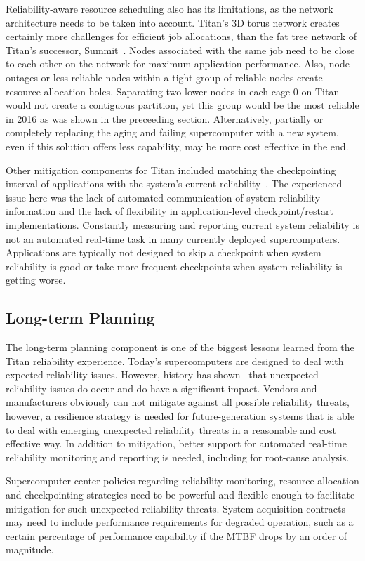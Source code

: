 Reliability-aware resource scheduling also has its limitations, as the network
architecture needs to be taken into account. Titan's 3D torus network creates
certainly more challenges for efficient job allocations, than the fat tree
network of Titan's successor, Summit~\cite{olcf:summit}. Nodes associated with
the same job need to be close to each other on the network for maximum
application performance. Also, node outages or less reliable nodes within a
tight group of reliable nodes create resource allocation
holes. Saparating two lower nodes in each cage 0 on Titan would not
create a contiguous partition, yet this group would be the most
reliable in 2016 as was shown in the preceeding section.
%
Alternatively, partially or completely replacing the aging and failing
supercomputer with a new system, even if this solution offers less capability,
may be more cost effective in the end.

Other mitigation components for Titan included matching the checkpointing
interval of applications with the system's current
reliability~\cite{bautista-gomez16reducing, 6903564}. The experienced issue here
was the lack of automated communication of system reliability information and
the lack of flexibility in application-level checkpoint/restart implementations.
Constantly measuring and reporting current system reliability is not an automated
real-time task in many currently deployed supercomputers. Applications are
typically not designed to skip a checkpoint when system reliability is good or
take more frequent checkpoints when system reliability is getting worse.

\subsection{Long-term Planning}
\label{section:planning}

The long-term planning component is one of the biggest lessons learned from the
Titan reliability experience. Today's supercomputers are designed to deal with
expected reliability issues. However, history has shown~\cite{geist12kill} that
unexpected reliability issues do occur and do have a significant impact. Vendors
and manufacturers obviously can not mitigate against all possible reliability
threats, however, a resilience strategy is needed for future-generation systems
that is able to deal with emerging unexpected reliability threats in a
reasonable and cost effective way. In addition to mitigation, better support for
automated real-time reliability monitoring and reporting is needed, including
for root-cause analysis.

Supercomputer center policies regarding reliability monitoring, resource
allocation and checkpointing strategies need to be powerful and flexible enough
to facilitate mitigation for such unexpected reliability threats. System
acquisition contracts may need to include performance requirements for degraded
operation, such as a certain percentage of performance capability if the MTBF
drops by an order of magnitude.
